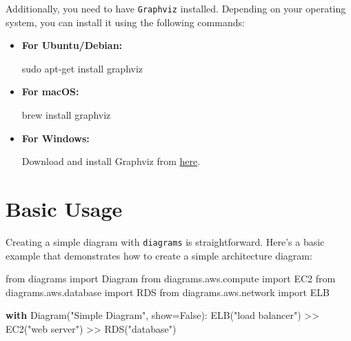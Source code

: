 \documentclass[
  letterpaper,
  DIV=11,
  numbers=noendperiod]{scrreprt}
\newenvironment{Shaded}{\begin{snugshade}}{\end{snugshade}}
\newcommand{\ControlFlowTok}[1]{\textcolor[rgb]{0.00,0.23,0.31}{\textbf{#1}}}
\newcommand{\ExtensionTok}[1]{\textcolor[rgb]{0.00,0.23,0.31}{#1}}
\newcommand{\FunctionTok}[1]{\textcolor[rgb]{0.28,0.35,0.67}{#1}}
\newcommand{\ImportTok}[1]{\textcolor[rgb]{0.00,0.46,0.62}{#1}}
\newcommand{\NormalTok}[1]{\textcolor[rgb]{0.00,0.23,0.31}{#1}}
\newcommand{\OperatorTok}[1]{\textcolor[rgb]{0.37,0.37,0.37}{#1}}
\newcommand{\StringTok}[1]{\textcolor[rgb]{0.13,0.47,0.30}{#1}}
\newcommand{\VariableTok}[1]{\textcolor[rgb]{0.07,0.07,0.07}{#1}}
\begin{document}
Additionally, you need to have \texttt{Graphviz} installed. Depending on
your operating system, you can install it using the following commands:

\begin{itemize}
\item
  \textbf{For Ubuntu/Debian:}

\begin{Shaded}
\begin{Highlighting}[]
\FunctionTok{sudo}\NormalTok{ apt{-}get install graphviz}
\end{Highlighting}
\end{Shaded}
\item
  \textbf{For macOS:}

\begin{Shaded}
\begin{Highlighting}[]
\ExtensionTok{brew}\NormalTok{ install graphviz}
\end{Highlighting}
\end{Shaded}
\item
  \textbf{For Windows:}

  Download and install Graphviz from
  \href{https://graphviz.gitlab.io/download/}{here}.
\end{itemize}

\section{Basic Usage}\label{basic-usage-4}

Creating a simple diagram with \texttt{diagrams} is straightforward.
Here's a basic example that demonstrates how to create a simple
architecture diagram:

\begin{Shaded}
\begin{Highlighting}[]
\ImportTok{from}\NormalTok{ diagrams }\ImportTok{import}\NormalTok{ Diagram}
\ImportTok{from}\NormalTok{ diagrams.aws.compute }\ImportTok{import}\NormalTok{ EC2}
\ImportTok{from}\NormalTok{ diagrams.aws.database }\ImportTok{import}\NormalTok{ RDS}
\ImportTok{from}\NormalTok{ diagrams.aws.network }\ImportTok{import}\NormalTok{ ELB}

\ControlFlowTok{with}\NormalTok{ Diagram(}\StringTok{"Simple Diagram"}\NormalTok{, show}\OperatorTok{=}\VariableTok{False}\NormalTok{):}
\NormalTok{    ELB(}\StringTok{"load balancer"}\NormalTok{) }\OperatorTok{\textgreater{}\textgreater{}}\NormalTok{ EC2(}\StringTok{"web server"}\NormalTok{) }\OperatorTok{\textgreater{}\textgreater{}}\NormalTok{ RDS(}\StringTok{"database"}\NormalTok{)}
\end{Highlighting}
\end{Shaded}
\end{document}
